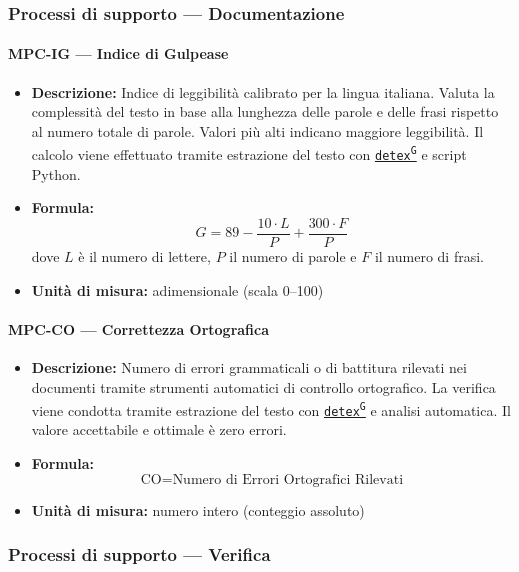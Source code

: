 \documentclass[a4paper,12pt]{article}
\providecommand{\glslink}[2]{\href{https://alittlebyte-19.github.io/Documentazione/glossario.html\#gls-#1}{\underline{#2}\textsuperscript{\scriptsize G}}}
\begin{document}
\subsubsection{Processi di supporto --- Documentazione}

\paragraph{MPC-IG --- Indice di Gulpease}
\begin{itemize}
    \item \textbf{Descrizione:} Indice di leggibilità calibrato per la lingua italiana. Valuta la complessità del testo in base alla lunghezza delle parole e delle frasi rispetto al numero totale di parole. Valori più alti indicano maggiore leggibilità. Il calcolo viene effettuato tramite estrazione del testo con \texttt{\glslink{detex}{detex}} e script Python.
    \item \textbf{Formula:}
    $$G = 89 - \frac{10 \cdot L}{P} + \frac{300 \cdot F}{P}$$
    dove $L$ è il numero di lettere, $P$ il numero di parole e $F$ il numero di frasi.
    \item \textbf{Unità di misura:} adimensionale (scala 0--100)
\end{itemize}

\paragraph{MPC-CO --- Correttezza Ortografica}
\begin{itemize}
    \item \textbf{Descrizione:} Numero di errori grammaticali o di battitura rilevati nei documenti tramite strumenti automatici di controllo ortografico. La verifica viene condotta tramite estrazione del testo con \texttt{\glslink{detex}{detex}} e analisi automatica. Il valore accettabile e ottimale è zero errori.
    \item \textbf{Formula:}
    $$\text{CO} = \text{Numero di Errori Ortografici Rilevati}$$
    \item \textbf{Unità di misura:} numero intero (conteggio assoluto)
\end{itemize}

\subsubsection{Processi di supporto --- Verifica}
\end{document}
